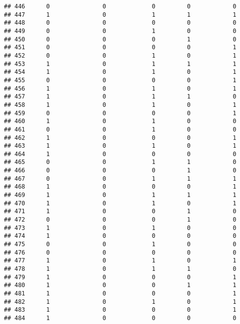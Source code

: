 \documentclass[]{article}
\begin{document}
\begin{verbatim}
## 446      0               0             0         0            0
## 447      1               0             1         1            1
## 448      0               0             0         0            0
## 449      0               0             1         0            0
## 450      0               0             0         1            0
## 451      0               0             0         0            1
## 452      0               0             1         0            1
## 453      1               0             1         1            1
## 454      1               0             1         0            1
## 455      0               0             0         0            1
## 456      1               0             1         0            1
## 457      1               0             1         1            0
## 458      1               0             1         0            1
## 459      0               0             0         0            1
## 460      1               0             1         0            0
## 461      0               0             1         0            0
## 462      1               0             0         0            1
## 463      1               0             1         0            1
## 464      1               0             0         0            0
## 465      0               0             1         1            0
## 466      0               0             0         1            0
## 467      0               0             1         1            1
## 468      1               0             0         0            1
## 469      1               0             1         1            1
## 470      1               0             1         0            1
## 471      1               0             0         1            0
## 472      0               0             0         1            0
## 473      1               0             1         0            0
## 474      1               0             0         0            0
## 475      0               0             1         0            0
## 476      0               0             0         0            0
## 477      1               0             1         0            1
## 478      1               0             1         1            0
## 479      1               0             0         0            1
## 480      1               0             0         1            1
## 481      1               0             0         0            1
## 482      1               0             1         0            1
## 483      1               0             0         0            1
## 484      1               0             0         0            0

\end{verbatim}
\end{document}
